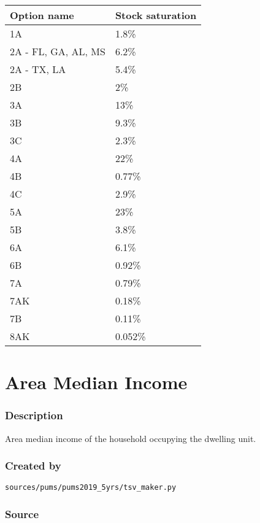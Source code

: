 \begin{longtable}[]{@{}ll@{}}
\toprule\noalign{}
Option name & Stock saturation \\
\midrule\noalign{}
\endhead
\bottomrule\noalign{}
\endlastfoot
1A & 1.8\% \\
2A - FL, GA, AL, MS & 6.2\% \\
2A - TX, LA & 5.4\% \\
2B & 2\% \\
3A & 13\% \\
3B & 9.3\% \\
3C & 2.3\% \\
4A & 22\% \\
4B & 0.77\% \\
4C & 2.9\% \\
5A & 23\% \\
5B & 3.8\% \\
6A & 6.1\% \\
6B & 0.92\% \\
7A & 0.79\% \\
7AK & 0.18\% \\
7B & 0.11\% \\
8AK & 0.052\% \\
\end{longtable}

\section{Area Median Income}\label{area_median_income}

\subsubsection{Description}\label{description-4}

Area median income of the household occupying the dwelling unit.

\subsubsection{Created by}\label{created-by-4}

\texttt{sources/pums/pums2019\_5yrs/tsv\_maker.py}

\subsubsection{Source}\label{source-4}

